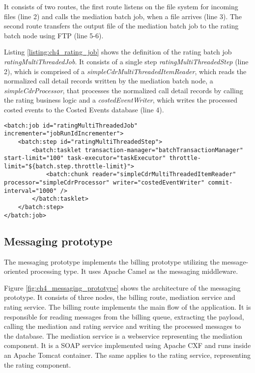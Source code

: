 It consists of two routes, the first route listens on the file system for incoming files (line 2) and calls the mediation batch job, when a file arrives (line 3). The second route transfers the output file of the mediation batch job to the rating batch node using \ac{FTP} (line 5-6).

Listing \ref{listing:ch4_rating_job} shows the definition of the rating batch job \emph{ratingMultiThreadedJob}. It consists of a single step \emph{ratingMultiThreadedStep} (line 2), which is comprised of a \emph{simpleCdrMultiThreadedItemReader}, which reads the normalized call detail records written by the mediation batch node, a \emph{simpleCdrProcessor}, that processes the normalized call detail records by calling the rating business logic and a \emph{costedEventWriter}, which writes the processed costed events to the Costed Events database (line 4).

\begin{lstlisting}[caption={Rating batch job definition},label=listing:ch4_rating_job]
<batch:job id="ratingMultiThreadedJob" incrementer="jobRunIdIncrementer">
	<batch:step id="ratingMultiThreadedStep">
		<batch:tasklet transaction-manager="batchTransactionManager" start-limit="100" task-executor="taskExecutor" throttle-limit="${batch.step.throttle-limit}">
			<batch:chunk reader="simpleCdrMultiThreadedItemReader" processor="simpleCdrProcessor" writer="costedEventWriter" commit-interval="1000" />
		</batch:tasklet>
	</batch:step>
</batch:job>
\end{lstlisting}

\subsection{Messaging prototype}

The messaging prototype implements the billing prototype utilizing the message-oriented processing type. It uses Apache Camel \citep{apachecamel} as the messaging middleware.

Figure \ref{fig:ch4_messaging_prototype} shows the architecture of the messaging prototype. It consists of three nodes, the billing route, mediation service and rating service. The billing route implements the main flow of the application. It is responsible for reading messages from the billing queue, extracting the payload, calling the mediation and rating service and writing the processed messages to the database. The mediation service is a webservice representing the mediation component. It is a SOAP service implemented using Apache CXF and runs inside an Apache Tomcat container. The same applies to the rating service, representing the rating component.

